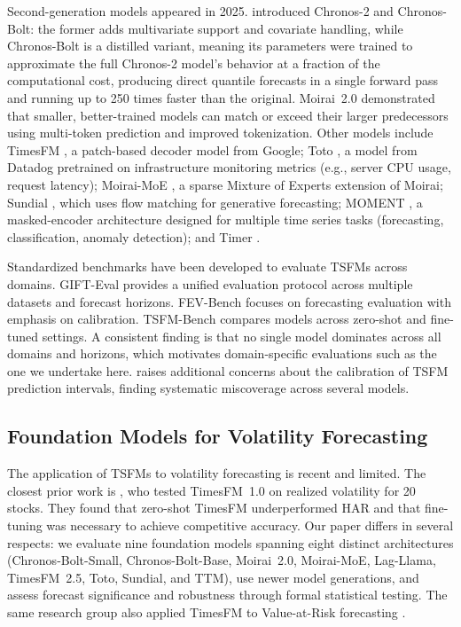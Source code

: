 \documentclass[12pt]{article}
\begin{document}
Second-generation models appeared in 2025. \citet{ansari2025chronos2} introduced Chronos-2 and Chronos-Bolt: the former adds multivariate support and covariate handling, while Chronos-Bolt is a distilled variant, meaning its parameters were trained to approximate the full Chronos-2 model's behavior at a fraction of the computational cost, producing direct quantile forecasts in a single forward pass and running up to 250 times faster than the original. Moirai~2.0 \citep{liu2025moirai2} demonstrated that smaller, better-trained models can match or exceed their larger predecessors using multi-token prediction and improved tokenization. Other models include TimesFM \citep{das2024timesfm}, a patch-based decoder model from Google; Toto \citep{cohen2024toto}, a model from Datadog pretrained on infrastructure monitoring metrics (e.g., server CPU usage, request latency); Moirai-MoE \citep{liu2024moiraimoe}, a sparse Mixture of Experts extension of Moirai; Sundial \citep{liu2025sundial}, which uses flow matching for generative forecasting; MOMENT \citep{goswami2024moment}, a masked-encoder architecture designed for multiple time series tasks (forecasting, classification, anomaly detection); and Timer \citep{liu2024timer}.

Standardized benchmarks have been developed to evaluate TSFMs across domains. GIFT-Eval \citep{aksu2024gifteval} provides a unified evaluation protocol across multiple datasets and forecast horizons. FEV-Bench \citep{shchur2025fevbench} focuses on forecasting evaluation with emphasis on calibration. TSFM-Bench \citep{li2024tsfmbench} compares models across zero-shot and fine-tuned settings. A consistent finding is that no single model dominates across all domains and horizons, which motivates domain-specific evaluations such as the one we undertake here. \citet{adler2025calibration} raises additional concerns about the calibration of TSFM prediction intervals, finding systematic miscoverage across several models.

\subsection{Foundation Models for Volatility Forecasting}
\label{subsec:fm_volatility}

The application of TSFMs to volatility forecasting is recent and limited. The closest prior work is \citet{goel2025rv}, who tested TimesFM~1.0 on realized volatility for 20 stocks. They found that zero-shot TimesFM underperformed HAR and that fine-tuning was necessary to achieve competitive accuracy. Our paper differs in several respects: we evaluate nine foundation models spanning eight distinct architectures (Chronos-Bolt-Small, Chronos-Bolt-Base, Moirai~2.0, Moirai-MoE, Lag-Llama, TimesFM~2.5, Toto, Sundial, and TTM), use newer model generations, and assess forecast significance and robustness through formal statistical testing. The same research group also applied TimesFM to Value-at-Risk forecasting \citep{goel2024var}.
\end{document}
